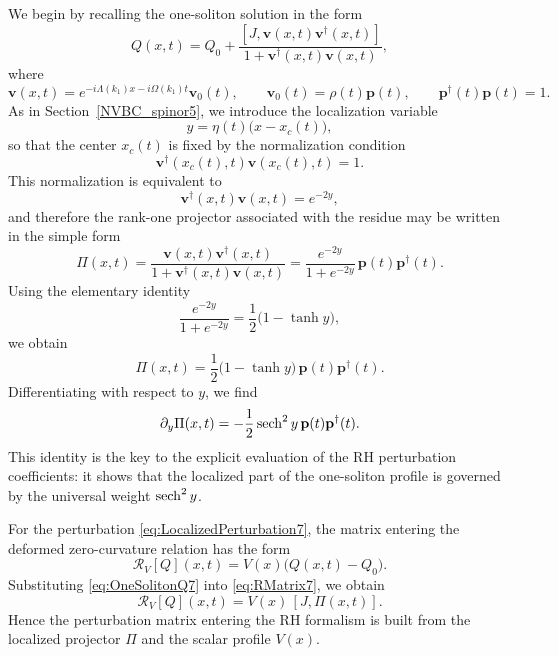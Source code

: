 \documentclass[11pt]{amsart}
\newcommand{\sech}{\mathop{\rm sech}\nolimits}
\theoremstyle{definition}
\numberwithin{equation}{section}
\begin{document}
We begin by recalling the one-soliton solution in the form
\begin{equation}
Q(x,t)=Q_0+\frac{[J,\mathbf{v}(x,t)\mathbf{v}^\dagger(x,t)]}{1+\mathbf{v}^\dagger(x,t)\mathbf{v}(x,t)},
\label{eq:OneSolitonQ7}
\end{equation}
where
\begin{equation}
\mathbf{v}(x,t)=e^{-i\Lambda(k_1)x-i\Omega(k_1)t}\mathbf{v}_0(t),
\qquad
\mathbf{v}_0(t)=\rho(t)\mathbf{p}(t),
\qquad
\mathbf{p}^\dagger(t)\mathbf{p}(t)=1.
\label{eq:vDecomposition7}
\end{equation}
As in Section~\ref{NVBC_spinor5}, we introduce the localization variable
\begin{equation}
y=\eta(t)\bigl(x-x_c(t)\bigr),
\label{eq:yVariable7}
\end{equation}
so that the center $x_c(t)$ is fixed by the normalization condition
\[
\mathbf{v}^\dagger(x_c(t),t)\mathbf{v}(x_c(t),t)=1.
\]
This normalization is equivalent to
\begin{equation}
\mathbf{v}^\dagger(x,t)\mathbf{v}(x,t)=e^{-2y},
\label{eq:vvdagger7}
\end{equation}
and therefore the rank-one projector associated with the residue may be written in the simple form
\begin{equation}
\Pi(x,t)
=
\frac{\mathbf{v}(x,t)\mathbf{v}^\dagger(x,t)}{1+\mathbf{v}^\dagger(x,t)\mathbf{v}(x,t)}
=
\frac{e^{-2y}}{1+e^{-2y}}\,\mathbf{p}(t)\mathbf{p}^\dagger(t).
\label{eq:PiExplicit7}
\end{equation}
Using the elementary identity
\[
\frac{e^{-2y}}{1+e^{-2y}}=\frac12\bigl(1-\tanh y\bigr),
\]
we obtain
\begin{equation}
\Pi(x,t)=\frac12\bigl(1-\tanh y\bigr)\,\mathbf{p}(t)\mathbf{p}^\dagger(t).
\label{eq:PiTanh7}
\end{equation}
Differentiating with respect to $y$, we find
\begin{equation}
\partial_y\Pi(x,t)=-\frac12 \sech^2 y\,\mathbf{p}(t)\mathbf{p}^\dagger(t).
\label{eq:PiDerivative7}
\end{equation}
This identity is the key to the explicit evaluation of the RH perturbation coefficients: it shows that the localized part of the one-soliton profile is governed by the universal weight $\sech^2 y$.

For the perturbation \eqref{eq:LocalizedPerturbation7}, the matrix entering the deformed zero-curvature relation has the form
\begin{equation}
\mathcal{R}_V[Q](x,t)=V(x)\bigl(Q(x,t)-Q_0\bigr).
\label{eq:RMatrix7}
\end{equation}
Substituting \eqref{eq:OneSolitonQ7} into \eqref{eq:RMatrix7}, we obtain
\begin{equation}
\mathcal{R}_V[Q](x,t)
=
V(x)\,[J,\Pi(x,t)].
\label{eq:RVPi7}
\end{equation}
Hence the perturbation matrix entering the RH formalism is built from the localized projector $\Pi$ and the scalar profile $V(x)$.
\end{document}
